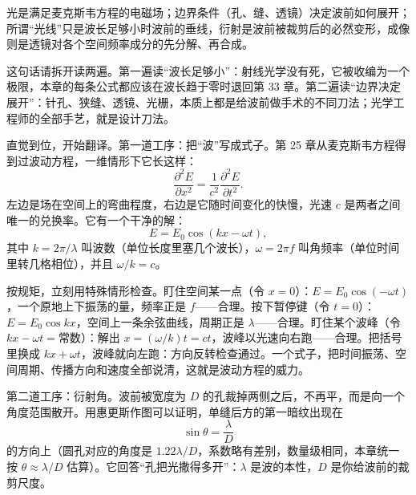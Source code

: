 
\begin{oneline}
光是满足麦克斯韦方程的电磁场；边界条件（孔、缝、透镜）决定波前如何展开；所谓“光线”只是波长足够小时波前的垂线，衍射是波前被裁剪后的必然变形，成像则是透镜对各个空间频率成分的先分解、再合成。
\end{oneline}

这句话请拆开读两遍。第一遍读“波长足够小”：射线光学没有死，它被收编为一个极限，本章的每条公式都应该在波长趋于零时退回第 33 章。第二遍读“边界决定展开”：针孔、狭缝、透镜、光栅，本质上都是给波前做手术的不同刀法；光学工程师的全部手艺，就是设计刀法。


直觉到位，开始翻译。第一道工序：把“波”写成式子。第 25 章从麦克斯韦方程得到过波动方程，一维情形下它长这样：
\[
  \frac{\partial^2 E}{\partial x^2}=\frac{1}{c^2}\frac{\partial^2 E}{\partial t^2}.
\]
左边是场在空间上的弯曲程度，右边是它随时间变化的快慢，光速 \(c\) 是两者之间唯一的兑换率。它有一个干净的解：
\[
  E=E_0\cos(kx-\omega t),
\]
其中 \(k=2\pi/\lambda\) 叫波数（单位长度里塞几个波长），\(\omega=2\pi f\) 叫角频率（单位时间里转几格相位），并且 \(\omega/k=c\)。

按规矩，立刻用特殊情形检查。盯住空间某一点（令 \(x=0\)）：\(E=E_0\cos(-\omega t)\)，一个原地上下振荡的量，频率正是 \(f\)——合理。按下暂停键（令 \(t=0\)）：\(E=E_0\cos kx\)，空间上一条余弦曲线，周期正是 \(\lambda\)——合理。盯住某个波峰（令 \(kx-\omega t=\text{常数}\)）：解出 \(x=(\omega/k)t=ct\)，波峰以光速向右跑——合理。把括号里换成 \(kx+\omega t\)，波峰就向左跑：方向反转检查通过。一个式子，把时间振荡、空间周期、传播方向和速度全部说清，这就是波动方程的威力。

第二道工序：衍射角。波前被宽度为 \(D\) 的孔裁掉两侧之后，不再平，而是向一个角度范围散开。用惠更斯作图可以证明，单缝后方的第一暗纹出现在
\[
  \sin\theta=\frac{\lambda}{D}
\]
的方向上（圆孔对应的角度是 \(1.22\lambda/D\)，系数略有差别，数量级相同，本章统一按 \(\theta\approx\lambda/D\) 估算）。它回答“孔把光撒得多开”：\(\lambda\) 是波的本性，\(D\) 是你给波前的裁剪尺度。

\begin{center}
\end{center}

